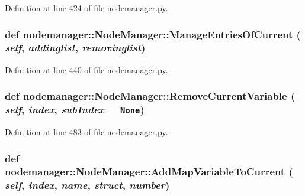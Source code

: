 Definition at line 424 of file nodemanager.py.\hypertarget{classnodemanager_1_1NodeManager_735fa1347836ef9be64a1ed34876f451}{
\subsubsection[ManageEntriesOfCurrent]{\setlength{\rightskip}{0pt plus 5cm}def nodemanager::Node\-Manager::Manage\-Entries\-Of\-Current ( {\em self},  {\em addinglist},  {\em removinglist})}}
\label{classnodemanager_1_1NodeManager_735fa1347836ef9be64a1ed34876f451}




Definition at line 440 of file nodemanager.py.\hypertarget{classnodemanager_1_1NodeManager_966a6a87de055ade4dc5f6aca08a307f}{
\subsubsection[RemoveCurrentVariable]{\setlength{\rightskip}{0pt plus 5cm}def nodemanager::Node\-Manager::Remove\-Current\-Variable ( {\em self},  {\em index},  {\em sub\-Index} = {\tt None})}}
\label{classnodemanager_1_1NodeManager_966a6a87de055ade4dc5f6aca08a307f}




Definition at line 483 of file nodemanager.py.\hypertarget{classnodemanager_1_1NodeManager_3291a925caac3db1aec97aa8175a487e}{
\subsubsection[AddMapVariableToCurrent]{\setlength{\rightskip}{0pt plus 5cm}def nodemanager::Node\-Manager::Add\-Map\-Variable\-To\-Current ( {\em self},  {\em index},  {\em name},  {\em struct},  {\em number})}}
\label{classnodemanager_1_1NodeManager_3291a925caac3db1aec97aa8175a487e}




